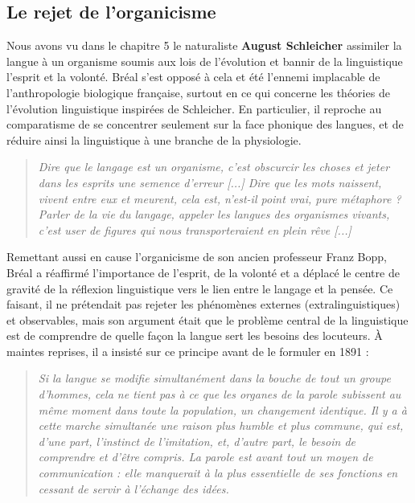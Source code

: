 \subsection{Le rejet de l’organicisme}
Nous avons vu dans le chapitre 5 le naturaliste \textbf{August Schleicher} assimiler la langue à un organisme soumis aux lois de l’évolution et bannir de la linguistique l’esprit et la volonté. Bréal s’est opposé à cela et été l’ennemi implacable de l’anthropologie biologique française, surtout en ce qui concerne les théories de l’évolution linguistique inspirées de Schleicher. En particulier, il reproche au comparatisme de se concentrer seulement sur la face phonique des langues, et de réduire ainsi la linguistique à une branche de la physiologie.
\begin{quote}\small\itshape
Dire que le langage est un organisme, c’est obscurcir les choses et jeter dans les esprits une semence d’erreur [...] Dire que les mots naissent, vivent entre eux et meurent, cela est, n’est-il point vrai, pure métaphore ? Parler de la vie du langage, appeler les langues des organismes vivants, c’est user de figures qui nous transporteraient en plein rêve [...]
\end{quote}
Remettant aussi en cause l’organicisme de son ancien professeur Franz Bopp, Bréal a réaffirmé l’importance de l’esprit, de la volonté et a déplacé le centre de gravité de la réflexion linguistique vers le lien entre le langage et la pensée. Ce faisant, il ne prétendait pas rejeter les phénomènes externes (extralinguistiques) et observables, mais son argument était que le problème central de la linguistique est de comprendre de quelle façon la langue sert les besoins des locuteurs. À maintes reprises, il a insisté sur ce principe avant de le formuler en 1891 :
\begin{quote}\small\itshape
Si la langue se modifie simultanément dans la bouche de tout un groupe d’hommes, cela ne tient pas à ce que les organes de la parole subissent au même moment dans toute la population, un changement identique. Il y a à cette marche simultanée une raison plus humble et plus commune, qui est, d’une part, l’instinct de l’imitation, et, d’autre part, le besoin de comprendre et d’être compris. La parole est avant tout un moyen de communication : elle manquerait à la plus essentielle de ses fonctions en cessant de servir à l’échange des idées.
\end{quote}
